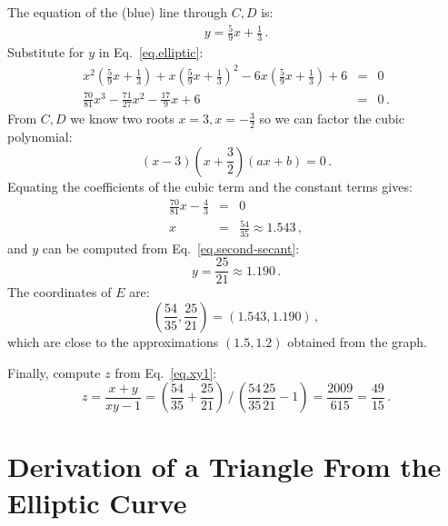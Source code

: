 The equation of the (blue) line through $C,D$ is:
\begin{align}
y = \frac{5}{9}x + \frac{1}{3}\,.\label{eq.second-secant}
\end{align}
Substitute for $y$ in Eq.~\ref{eq.elliptic}:
\begin{eqnarray*}
x^2\left(\frac{5}{9}x + \frac{1}{3}\right) + x\left(\frac{5}{9}x + \frac{1}{3}\right)^2 -6x\left(\frac{5}{9}x + \frac{1}{3}\right) +6 &=&0\\
\frac{70}{81}x^3 - \frac{71}{27}x^2 - \frac{17}{9}x +6 &=&0\,.
\end{eqnarray*}
From $C,D$ we know two roots $x=3,x=-\frac{3}{2}$ so we can factor the cubic polynomial:
\[
(x-3)\left(x+\frac{3}{2}\right)(ax+b)=0\,.
\]
Equating the coefficients of the cubic term and the constant terms gives:
\begin{eqnarray*}
\frac{70}{81}x - \frac{4}{3}&=&0\\
x&=& \frac{54}{35}\approx 1.543\,,
\end{eqnarray*}
and $y$ can be computed from Eq.~\ref{eq.second-secant}:
\[
y=\frac{25}{21}\approx 1.190\,.
\]
The coordinates of $E$ are:
\[
\left(\frac{54}{35}, \frac{25}{21}\right)=(1.543,1.190)\,,
\]
which are close to the approximations $(1.5,1.2)$ obtained from the graph.

Finally, compute $z$ from Eq.~\ref{eq.xy1}:
\[
z=\frac{x+y}{xy-1}=%
\displaystyle\left(\frac{54}{35} + \frac{25}{21}\right)%
 \, \bigg/ \,%
\displaystyle\left(\frac{54}{35}\frac{25}{21}-1\right)=%
\frac{2009}{615} = \frac{49}{15}\,.
\]

\section{Derivation of a Triangle From the Elliptic Curve}

\enlargethispage*{\baselineskip}

